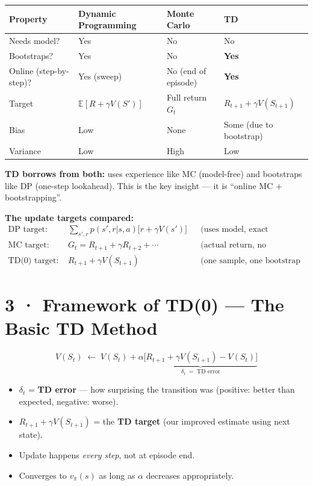 \documentclass[11pt,a4paper]{article}
\begin{document}
\begin{tcolorbox}[bold={The Triangle: DP vs MC vs TD}]
\begin{center}
\begin{tabular}{p{3cm}p{4cm}p{4cm}p{3.5cm}}
\toprule
\textbf{Property} & \textbf{Dynamic Programming} & \textbf{Monte Carlo} & \textbf{TD} \\
\midrule
Needs model? & Yes & No & No \\
Bootstraps? & Yes & No & \textbf{Yes} \\
Online (step-by-step)? & Yes (sweep) & No (end of episode) & \textbf{Yes} \\
Target & $\mathbb{E}[R + \gamma V(S')]$ & Full return $G_t$ & $R_{t+1} + \gamma V(S_{t+1})$ \\
Bias & Low & None & Some (due to bootstrap) \\
Variance & Low & High & Low \\
\bottomrule
\end{tabular}
\end{center}
\medskip
\textbf{TD borrows from both:} uses experience like MC (model-free) and bootstraps like DP (one-step lookahead).
This is the key insight — it is ``online MC + bootstrapping''.
\end{tcolorbox}

\textbf{The update targets compared:}
\begin{align*}
  \text{DP target:}\quad      & \sum_{s',r} p(s',r|s,a)\bigl[r + \gamma V(s')\bigr] &&\text{(uses model, exact expectation)} \\
  \text{MC target:}\quad      & G_t = R_{t+1} + \gamma R_{t+2} + \cdots &&\text{(actual return, no bootstrap)} \\
  \text{TD(0) target:}\quad   & R_{t+1} + \gamma V(S_{t+1}) &&\text{(one sample, one bootstrap step)}
\end{align*}

\section*{3 · Framework of TD(0) — The Basic TD Method}

\begin{tcolorbox}[bold={TD(0) Prediction Update}]
\[
  V(S_t) \;\leftarrow\; V(S_t) + \alpha\underbrace{\bigl[R_{t+1} + \gamma V(S_{t+1}) - V(S_t)\bigr]}_{\delta_t \;=\; \text{TD error}}
\]
\begin{itemize}
  \item $\delta_t$ = \textbf{TD error} — how surprising the transition was (positive: better than expected, negative: worse).
  \item $R_{t+1} + \gamma V(S_{t+1})$ = the \textbf{TD target} (our improved estimate using next state).
  \item Update happens \emph{every step}, not at episode end.
  \item Converges to $v_\pi(s)$ as long as $\alpha$ decreases appropriately.
\end{itemize}
\end{tcolorbox}
\end{document}
